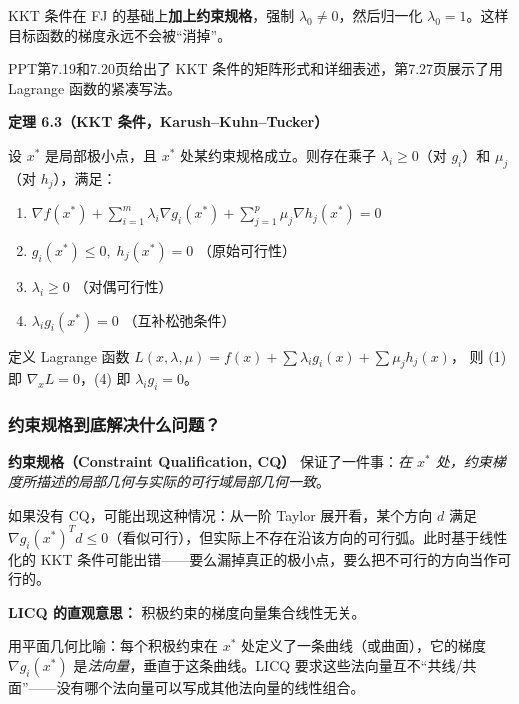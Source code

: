 KKT 条件在 FJ 的基础上\textbf{加上约束规格}，强制 $\lambda_0 \neq 0$，然后归一化 $\lambda_0=1$。这样目标函数的梯度永远不会被“消掉”。

PPT第7.19和7.20页给出了 KKT 条件的矩阵形式和详细表述，第7.27页展示了用 Lagrange 函数的紧凑写法。

\medskip
{}
\medskip
{}
\medskip

\begin{defbox}
\textbf{定理 6.3（KKT 条件，Karush--Kuhn--Tucker）}

设 $x^*$ 是局部极小点，且 $x^*$ 处某约束规格成立。则存在乘子 $\lambda_i\ge 0$（对 $g_i$）和 $\mu_j$（对 $h_j$），满足：

{\footnotesize
\begin{enumerate}
  \item $\displaystyle\nabla f(x^*) + \sum_{i=1}^m \lambda_i \nabla g_i(x^*) + \sum_{j=1}^p \mu_j \nabla h_j(x^*) = 0$
  \item $g_i(x^*) \le 0,\; h_j(x^*) = 0$ （原始可行性）
  \item $\lambda_i \ge 0$ （对偶可行性）
  \item $\lambda_i g_i(x^*) = 0$ （互补松弛条件）
\end{enumerate}
}

\vspace{2pt}
定义 Lagrange 函数 $L(x,\lambda,\mu)=f(x)+\sum\lambda_i g_i(x)+\sum\mu_j h_j(x)$，
则 (1) 即 $\nabla_x L = 0$，(4) 即 $\lambda_i g_i = 0$。
\end{defbox}

\medskip
{}
\medskip

\subsubsection{约束规格到底解决什么问题？}

\textbf{约束规格（Constraint Qualification, CQ）} 保证了一件事：\emph{在 $x^*$ 处，约束梯度所描述的局部几何与实际的可行域局部几何一致}。

如果没有 CQ，可能出现这种情况：从一阶 Taylor 展开看，某个方向 $d$ 满足 $\nabla g_i(x^*)^T d \le 0$（看似可行），但实际上不存在沿该方向的可行弧。此时基于线性化的 KKT 条件可能出错——要么漏掉真正的极小点，要么把不可行的方向当作可行的。

\textbf{LICQ 的直观意思：} 积极约束的梯度向量集合线性无关。

用平面几何比喻：每个积极约束在 $x^*$ 处定义了一条曲线（或曲面），它的梯度 $\nabla g_i(x^*)$ 是\emph{法向量}，垂直于这条曲线。LICQ 要求这些法向量互不“共线/共面”——没有哪个法向量可以写成其他法向量的线性组合。

